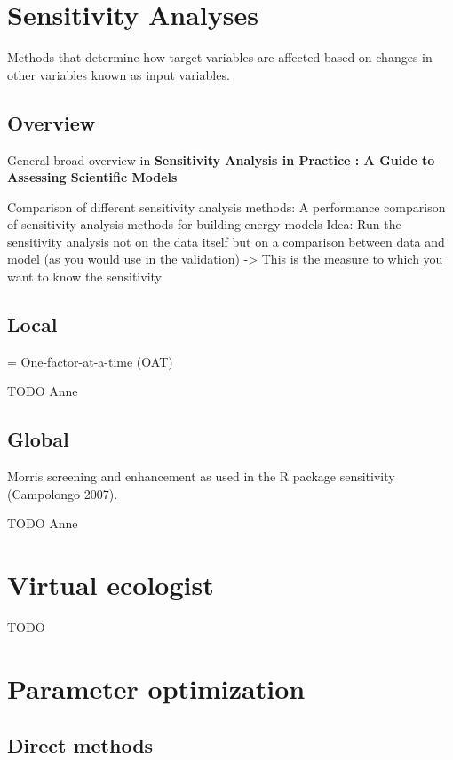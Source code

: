 \documentclass[
]{book}
\begin{document}
\section{Sensitivity Analyses}\label{sensitivity-analyses}

Methods that determine how target variables are affected based on
changes in other variables known as input variables.

\subsection{Overview}\label{overview}

General broad overview in \textbf{Sensitivity Analysis in Practice : A Guide
to Assessing Scientific Models} \citep{saltelli2002}

Comparison of different sensitivity analysis methods: A performance
comparison of sensitivity analysis methods for building energy models
Idea: Run the sensitivity analysis not on the data itself but on a
comparison between data and model (as you would use in the validation)
-\textgreater{} This is the measure to which you want to know the sensitivity

\subsection{Local}\label{local}

= One-factor-at-a-time (OAT)

TODO Anne

\subsection{Global}\label{global}

Morris screening and enhancement as used in the R package sensitivity
(Campolongo 2007).

TODO Anne

\section{Virtual ecologist}\label{virtual-ecologist}

TODO

\section{Parameter optimization}\label{parameter-optimization}

\subsection{Direct methods}\label{direct-methods}
\end{document}
